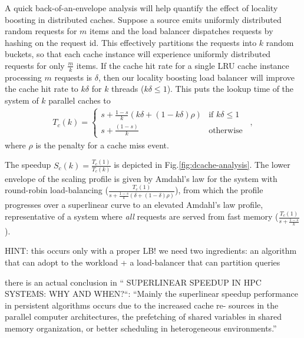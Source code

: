 A quick back-of-an-envelope analysis will help quantify the effect of locality boosting in distributed caches. Suppose a source emits uniformly distributed random requests for $m$ items and the load balancer dispatches requests by hashing on the request id. This effectively partitions the requests into $k$ random buckets, so that each cache instance will experience uniformly distributed requests for only $\frac{m}{k}$ items. If the cache hit rate for a single LRU cache instance processing $m$ requests is $\delta$, then our locality boosting load balancer will improve the cache hit rate to $k\delta$ for $k$ threads ($k\delta \le 1$). This puts the lookup time of the system of $k$ parallel caches to
\begin{align}\label{eq:dist-cache}
  T_c(k) = \begin{cases} s + \frac{1-s}{k}(k\delta + (1-k\delta)\rho) & \text{if } k\delta \le 1\\s + \frac{(1-s)}{k} & \text{otherwise}\end{cases} \enspace ,
\end{align}
where $\rho$ is the penalty for a cache miss event.

The speedup $S_c(k)=\frac{T_c(1)}{T_c(k)}$ is depicted in Fig.\ref{fig:dcache-analysis}. The lower envelope of the scaling profile is given by Amdahl's law for the system with round-robin load-balancing ($\frac{T_c(1)}{s + \frac{1-s}{k}(\delta + (1-\delta)\rho)}$), from which the profile progresses over a superlinear curve to an elevated Amdahl's law profile, representative of a system where \emph{all} requests are served from fast memory ($\frac{T_c(1)}{s + \frac{1-s}{k}}$).

HINT: this occurs only with a proper LB! we need two ingredients: an algorithm that can adopt to the workload + a load-balancer that can partition queries



there is an actual conclusion in `` SUPERLINEAR SPEEDUP IN HPC SYSTEMS: WHY AND WHEN?``: ``Mainly the superlinear speedup performance in persistent algorithms occurs due to the increased cache re- sources in the parallel computer architectures, the prefetching of shared variables in shared memory organization, or better scheduling in heterogeneous environments.''




